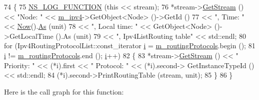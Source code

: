 \begin{DoxyCode}
74 \{
75   \hyperlink{log-macros-disabled_8h_a90b90d5bad1f39cb1b64923ea94c0761}{NS\_LOG\_FUNCTION} (\textcolor{keyword}{this} << stream);
76   *stream->\hyperlink{classns3_1_1OutputStreamWrapper_a0cf30a4188ab6fdae2b2ab74db11acc2}{GetStream} () << \textcolor{stringliteral}{"Node: "} << \hyperlink{classns3_1_1Ipv4ListRouting_aaf41416278c236de8b12028f91a40106}{m\_ipv4}->GetObject<Node> ()->GetId () 
77                         << \textcolor{stringliteral}{", Time: "} << \hyperlink{group__simulator_gac3635e2e87f7ce316c89290ee1b01d0d}{Now}().\hyperlink{classns3_1_1Time_a0bb1110638ce9938248bd07865a328ab}{As} (unit)
78                         << \textcolor{stringliteral}{", Local time: "} << GetObject<Node> ()->GetLocalTime ().As (unit)
79                         << \textcolor{stringliteral}{", Ipv4ListRouting table"} << std::endl;
80   \textcolor{keywordflow}{for} (Ipv4RoutingProtocolList::const\_iterator \hyperlink{bernuolliDistribution_8m_a6f6ccfcf58b31cb6412107d9d5281426}{i} = \hyperlink{classns3_1_1Ipv4ListRouting_a49de17cac4bf72e28b064bff3a93d29d}{m\_routingProtocols}.begin ();
81        \hyperlink{bernuolliDistribution_8m_a6f6ccfcf58b31cb6412107d9d5281426}{i} != \hyperlink{classns3_1_1Ipv4ListRouting_a49de17cac4bf72e28b064bff3a93d29d}{m\_routingProtocols}.end (); \hyperlink{bernuolliDistribution_8m_a6f6ccfcf58b31cb6412107d9d5281426}{i}++)
82     \{
83       *stream->\hyperlink{classns3_1_1OutputStreamWrapper_a0cf30a4188ab6fdae2b2ab74db11acc2}{GetStream} () << \textcolor{stringliteral}{"  Priority: "} << (*i).first << \textcolor{stringliteral}{" Protocol: "} << (*i).second->
      GetInstanceTypeId () << std::endl;
84       (*i).second->PrintRoutingTable (stream, unit);
85     \}
86 \}
\end{DoxyCode}


Here is the call graph for this function\+:


